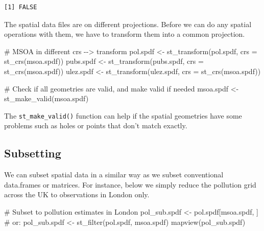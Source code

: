 \documentclass[
  letterpaper,
]{scrbook}
\newenvironment{Shaded}{\begin{snugshade}}{\end{snugshade}}
\newcommand{\AttributeTok}[1]{\textcolor[rgb]{0.40,0.45,0.13}{#1}}
\newcommand{\CommentTok}[1]{\textcolor[rgb]{0.37,0.37,0.37}{#1}}
\newcommand{\FunctionTok}[1]{\textcolor[rgb]{0.28,0.35,0.67}{#1}}
\newcommand{\NormalTok}[1]{\textcolor[rgb]{0.00,0.23,0.31}{#1}}
\newcommand{\OtherTok}[1]{\textcolor[rgb]{0.00,0.23,0.31}{#1}}
\begin{document}
\begin{verbatim}
[1] FALSE
\end{verbatim}

The spatial data files are on different projections. Before we can do
any spatial operations with them, we have to transform them into a
common projection.

\begin{Shaded}
\begin{Highlighting}[]
\CommentTok{\# MSOA in different crs {-}{-}\textgreater{} transform}
\NormalTok{pol.spdf }\OtherTok{\textless{}{-}} \FunctionTok{st\_transform}\NormalTok{(pol.spdf, }\AttributeTok{crs =} \FunctionTok{st\_crs}\NormalTok{(msoa.spdf))}
\NormalTok{pubs.spdf }\OtherTok{\textless{}{-}} \FunctionTok{st\_transform}\NormalTok{(pubs.spdf, }\AttributeTok{crs =} \FunctionTok{st\_crs}\NormalTok{(msoa.spdf))}
\NormalTok{ulez.spdf }\OtherTok{\textless{}{-}} \FunctionTok{st\_transform}\NormalTok{(ulez.spdf, }\AttributeTok{crs =} \FunctionTok{st\_crs}\NormalTok{(msoa.spdf))}


\CommentTok{\# Check if all geometries are valid, and make valid if needed}
\NormalTok{msoa.spdf }\OtherTok{\textless{}{-}} \FunctionTok{st\_make\_valid}\NormalTok{(msoa.spdf)}
\end{Highlighting}
\end{Shaded}

The \texttt{st\_make\_valid()} function can help if the spatial
geometries have some problems such as holes or points that don't match
exactly.

\hypertarget{subsetting}{%
\subsection{Subsetting}\label{subsetting}}

We can subset spatial data in a similar way as we subset conventional
data.frames or matrices. For instance, below we simply reduce the
pollution grid across the UK to observations in London only.

\begin{Shaded}
\begin{Highlighting}[]
\CommentTok{\# Subset to pollution estimates in London}
\NormalTok{pol\_sub.spdf }\OtherTok{\textless{}{-}}\NormalTok{ pol.spdf[msoa.spdf, ] }\CommentTok{\# or:}
\NormalTok{pol\_sub.spdf }\OtherTok{\textless{}{-}} \FunctionTok{st\_filter}\NormalTok{(pol.spdf, msoa.spdf)}
\FunctionTok{mapview}\NormalTok{(pol\_sub.spdf)}
\end{Highlighting}
\end{Shaded}
\end{document}
